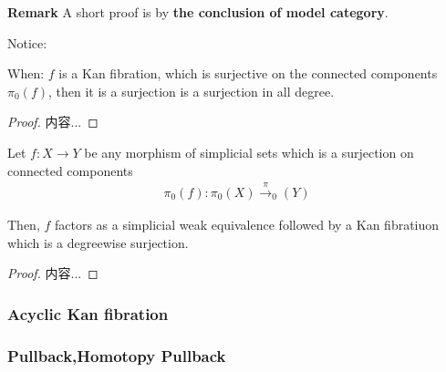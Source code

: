 \documentclass[Total.tex]{subfiles}
\begin{document}
				\textbf{Remark} A short proof is by \textbf{the conclusion of model category}. 
				
				Notice: 
				
				\begin{lemma}
					When: $f$ is a Kan fibration, which is surjective on the connected components $\pi_0(f)$, then it is a surjection is  a surjection in all degree.
				\end{lemma}
				\begin{proof}
					内容...
				\end{proof}
				
				\begin{proposition}
					Let $f:X\rightarrow Y$ be any morphism of simplicial sets which is a surjection on connected components
					\begin{gather*}
						\pi_0(f):\pi_0(X)\xrightarrow \pi_0(Y)
					\end{gather*}
					
					Then, $f$ factors as a simplicial weak equivalence followed by a Kan fibratiuon which is a degreewise surjection.
				\end{proposition}
				\begin{proof}
					内容...
				\end{proof}
				\subsubsection{Acyclic Kan fibration}
				\subsubsection{Pullback,Homotopy Pullback}
\end{document}

